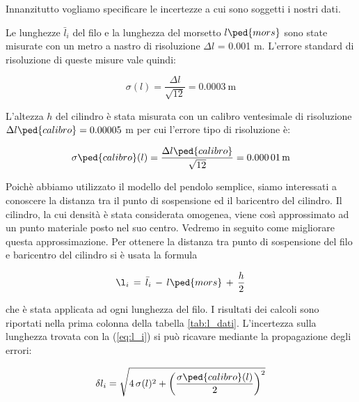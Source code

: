 \label{l_medie}

Innanzitutto vogliamo specificare le incertezze a cui sono soggetti i nostri dati.

Le lunghezze $\bar{l}_i$ del filo e la lunghezza del morsetto $l\ped{mors}$ sono state misurate con un metro a nastro di risoluzione
$\Delta l$ = 0.001 m. L'errore standard di risoluzione di queste misure vale quindi:

\begin{equation}
    \sigma(l) = \frac{\Delta l}{\sqrt{12}} = \SI{0.0003}{\metre}
\end{equation}

L'altezza $h$ del cilindro è stata misurata con un calibro ventesimale di risoluzione $\Delta l\ped{calibro} = 0.00005$ m
per cui l'errore tipo di risoluzione è:

\begin{equation}
    \sigma\ped{calibro}(l) = \frac{\Delta l\ped{calibro}}{\sqrt{12}} = \SI{0.00001}{\metre}
\end{equation}

Poichè abbiamo utilizzato il modello del pendolo semplice, siamo interessati a conoscere la distanza tra il punto
di sospensione ed il baricentro del cilindro. Il cilindro, la cui densità è stata considerata omogenea,
viene così approssimato ad un punto materiale posto nel suo centro. Vedremo in seguito come migliorare questa approssimazione.
Per ottenere la distanza tra punto di sospensione del filo e baricentro del cilindro si è usata la formula

\begin{equation}
	\l_i \,=\, \bar{l}_i \,-\, l\ped{mors} \,+\, \frac{h}{2}
    \label{eq:l_i}
\end{equation}

che è stata applicata ad ogni lunghezza del filo. I risultati dei calcoli sono riportati nella prima colonna
della tabella \ref{tab:l_dati}. L'incertezza sulla lunghezza trovata con la (\ref{eq:l_i}) si può ricavare mediante la propagazione
degli errori:

\begin{equation}
	\delta l_i = \sqrt{4\,\sigma(l)^2 + \left(\frac{\sigma\ped{calibro}(l)}{2}\right) ^2}
\end{equation}

